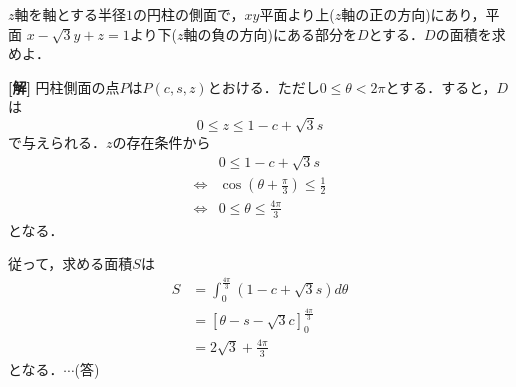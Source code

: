 \documentclass[a4j]{jarticle}
\begin{document}

     \begin{oframed}
     $z$軸を軸とする半径$1$の円柱の側面で，$xy$平面より上($z$軸の正の方向)にあり，平面
     $x-\sqrt{3}y+z=1$より下($z$軸の負の方向)にある部分を$D$とする．$D$の面積を求めよ．
     \end{oframed}

\setlength{\columnseprule}{0.4pt}
\begin{multicols}{2}
{\bf[解]} \1 円柱側面の点$P$は$P(c,s,z)$とおける．ただし$0\le\theta<2\pi$とする．すると，$D$は
     \[0\le z\le1-c+\sqrt{3}s \]
で与えられる．$z$の存在条件から
     \begin{align*}
     &0\le 1-c+\sqrt{3}s \\
      \Longleftrightarrow &\cos\left(\theta+\frac{\pi}{3}\right)\le \frac{1}{2} \\
     \Longleftrightarrow &0\le\theta\le\frac{4\pi}{3}
     \end{align*}
となる．

従って，求める面積$S$は
     \begin{align*}
     S&=\int_0^\frac{4\pi}{3}(1-c+\sqrt{3}s)d\theta \\
     &=\left[\theta-s-\sqrt{3}c\right]_0^\frac{4\pi}{3} \\
     &=2\sqrt{3}+\frac{4\pi}{3}
     \end{align*}
となる．$\cdots$(答)
     
\newpage
\end{multicols}
\end{document}
